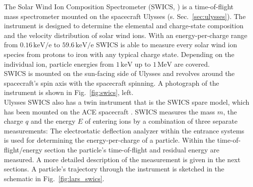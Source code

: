The Solar Wind Ion Composition Spectrometer (SWICS, \citet{gloeckler_1992}) is a time-of-flight mass spectrometer mounted on the spacecraft Ulysses (s. Sec.~\ref{sec:ulysses}). The instrument is designed to determine the elemental and charge-state composition and the velocity distribution of solar wind ions. With an energy-per-charge range from $0.16 \, \mathrm{keV/e}$ to $59.6 \, \mathrm{keV/e}$ SWICS is able to measure every solar wind ion species from protons to iron with any typical charge state. Depending on the individual ion, particle energies from $1 \,\mathrm{keV}$ up to $1 \, \mathrm{MeV}$ are covered.\\
SWICS is mounted on the sun-facing side of Ulysses and revolves around the spacecraft's spin axis with the spacecraft spinning. A photograph of the instrument is shown in Fig.~\ref{fig:swics}, left.\\
Ulysses SWICS also has a twin instrument that is the SWICS spare model, which has been mounted on the ACE spacecraft \citep{stone_ace}.
%
%
%
SWICS measures the mass $m$, the charge $q$ and the energy $E$ of entering ions by a combination of three separate measurements: The electrostatic deflection analyzer within the entrance systems is used for determining the energy-per-charge of a particle. Within the time-of-flight/energy section the particle's time-of-flight and residual energy are measured. A more detailed description of the measurement is given in the next sections. A particle's trajectory through the instrument is sketched in the schematic in Fig.~\ref{fig:lars_swics}.
%
